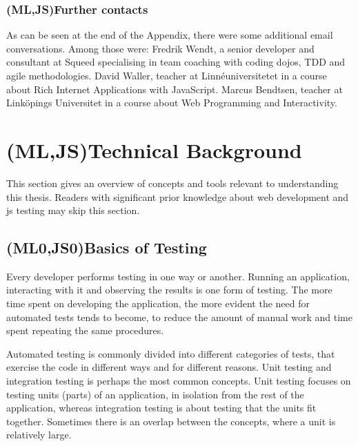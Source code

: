 \documentclass[11pt]{article}
\begin{document}
\subsubsection{(ML,JS)Further contacts}

As can be seen at the end of the Appendix, there were some additional email conversations. Among those were: Fredrik Wendt, a senior developer and consultant at Squeed specialising in team coaching with coding dojos, TDD and agile methodologies. David Waller, teacher at Linnéuniversitetet in a course about Rich Internet Applications with JavaScript. Marcus Bendtsen, teacher at Linköpings Universitet in a course about Web Programming and Interactivity.


\section{(ML,JS)Technical Background}

This section gives an overview of concepts and tools relevant to understanding this thesis. Readers with significant prior knowledge about web development and \gls{js} testing may skip this section.

\subsection{(ML0,JS0)Basics of Testing}
\label{subsec:testingbasics}

Every developer performs testing in one way or another. Running an application, interacting with it and observing the results is one form of testing. The more time spent on developing the application, the more evident the need for automated tests tends to become, to reduce the amount of manual work and time spent repeating the same procedures.

Automated testing is commonly divided into different categories of tests, that exercise the code in different ways and for different reasons. Unit testing and integration testing is perhaps the most common concepts. Unit testing focuses on testing units (parts) of an application, in isolation from the rest of the application, whereas integration testing is about testing that the units fit together. Sometimes there is an overlap between the concepts, where a unit is relatively large.
\end{document}
